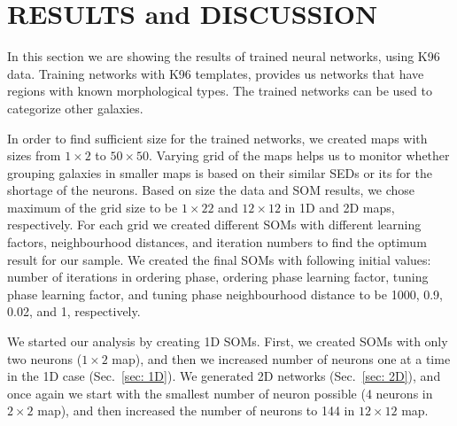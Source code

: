 \section{RESULTS and DISCUSSION}
\label{sec: result}

    In this section we are showing the results of trained neural networks, using K96 data.
    Training networks with K96 templates, provides us networks that have regions with known morphological types. The trained networks can be used to categorize other galaxies.
    
    In order to find sufficient size for the trained networks, we created maps with sizes from $1\times2$ to $50\times50$.
    Varying grid of the maps helps us to monitor whether grouping galaxies in smaller maps is based on their similar SEDs or its for the shortage of the neurons.
    Based on size the data and SOM results, we chose maximum of the grid size to be $1\times22$ and $12\times12$ in 1D and 2D maps, respectively. 
    For each grid we created different SOMs with different learning factors, neighbourhood distances, and iteration numbers to find the optimum result for our sample.
    We created the final SOMs with following initial values: number of iterations in ordering phase, ordering phase learning factor, tuning phase learning factor, and tuning phase neighbourhood distance to be 1000, 0.9, 0.02, and 1, respectively.
   
    We started our analysis by creating 1D SOMs. 
    First, we created SOMs with only two neurons ($1\times2$ map), and then we increased number of neurons one at a time in the 1D case (Sec.~\ref{sec: 1D}).
    We generated 2D networks (Sec.~\ref{sec: 2D}), and once again we start with the smallest number of neuron possible (4 neurons in $2\times2$ map), and then increased the number of neurons to 144 in $12\times12$ map.
    
